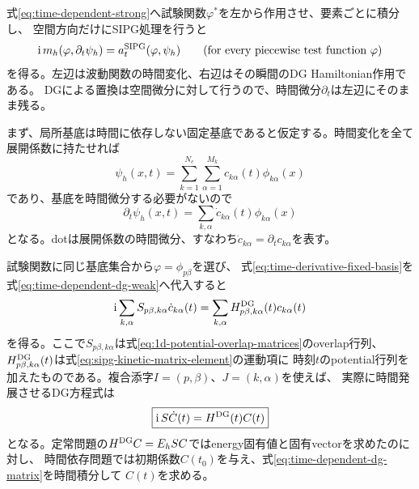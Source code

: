 \documentclass[11pt,a4paper]{article}
\begin{document}
式\eqref{eq:time-dependent-strong}へ試験関数$\varphi^*$を左から作用させ、要素ごとに積分し、
空間方向だけにSIPG処理を行うと
\begin{equation}
 \mathrm i\,m_h(\varphi,\partial_t\psi_h)
 =a_t^{\rm SIPG}(\varphi,\psi_h)
 \qquad(\text{for every piecewise test function }\varphi)
 \label{eq:time-dependent-dg-weak}
\end{equation}
を得る。左辺は波動関数の時間変化、右辺はその瞬間のDG Hamiltonian作用である。
DGによる置換は空間微分に対して行うので、時間微分$\partial_t$は左辺にそのまま残る。

まず、局所基底は時間に依存しない固定基底であると仮定する。時間変化を全て展開係数に持たせれば
\begin{equation}
 \psi_h(x,t)=\sum_{k=1}^{N_e}\sum_{\alpha=1}^{M_k}
 c_{k\alpha}(t)\phi_{k\alpha}(x)
 \label{eq:time-dependent-basis-expansion}
\end{equation}
であり、基底を時間微分する必要がないので
\begin{equation}
 \partial_t\psi_h(x,t)=\sum_{k,\alpha}\dot c_{k\alpha}(t)\phi_{k\alpha}(x)
 \label{eq:time-derivative-fixed-basis}
\end{equation}
となる。dotは展開係数の時間微分、すなわち$\dot c_{k\alpha}=\partial_t c_{k\alpha}$を表す。

試験関数に同じ基底集合から$\varphi=\phi_{p\beta}$を選び、
式\eqref{eq:time-derivative-fixed-basis}を式\eqref{eq:time-dependent-dg-weak}へ代入すると
\begin{equation}
 \mathrm i\sum_{k,\alpha}S_{p\beta,k\alpha}\dot c_{k\alpha}(t)
 =\sum_{k,\alpha}H^{\rm DG}_{p\beta,k\alpha}(t)c_{k\alpha}(t)
 \label{eq:time-dependent-dg-coefficients}
\end{equation}
を得る。ここで$S_{p\beta,k\alpha}$は式\eqref{eq:1d-potential-overlap-matrices}のoverlap行列、
$H^{\rm DG}_{p\beta,k\alpha}(t)$は式\eqref{eq:sipg-kinetic-matrix-element}の運動項に
時刻$t$のpotential行列を加えたものである。複合添字$I=(p,\beta)$、$J=(k,\alpha)$を使えば、
実際に時間発展させるDG方程式は
\begin{equation}
 \boxed{\mathrm i\,S\dot C(t)=H^{\rm DG}(t)C(t)}
 \label{eq:time-dependent-dg-matrix}
\end{equation}
となる。定常問題の$H^{\rm DG}C=E_hSC$ではenergy固有値と固有vectorを求めたのに対し、
時間依存問題では初期係数$C(t_0)$を与え、式\eqref{eq:time-dependent-dg-matrix}を時間積分して
$C(t)$を求める。
\end{document}
